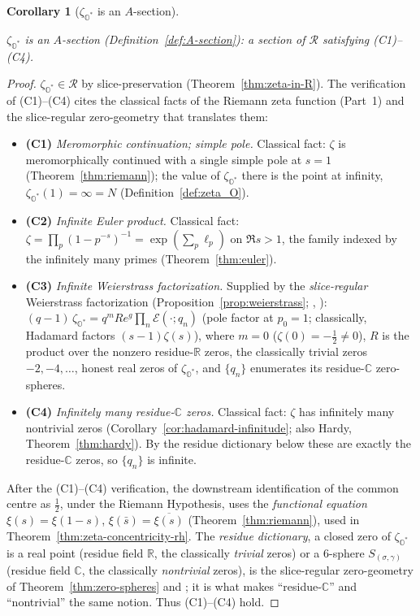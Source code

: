 \documentclass[11pt]{article}
\newcommand{\OO}{\mathbb{O}}
\newcommand{\CC}{\mathbb{C}}
\newcommand{\RR}{\mathbb{R}}
\newcommand{\Ostar}{\OO^{*}}
\newcommand{\zetaO}{\zeta_{\Ostar}}
\providecommand{\lean}[1]{}
\providecommand{\uses}[1]{}
\theoremstyle{plain}
\newtheorem{corollary}[theorem]{Corollary}
\theoremstyle{definition}
\theoremstyle{remark}
\begin{document}
\begin{corollary}[$\zetaO$ is an $A$-section]\label{cor:zeta-section}
\lean{zetaSection}
\uses{def:A-section, thm:zeta-in-R, thm:riemann, thm:euler, cor:hadamard-infinitude, prop:weierstrass, thm:zero-spheres}
$\zetaO$ is an $A$-section \textup{(Definition~\ref{def:A-section})}: a section of
$\mathcal R$ satisfying \textup{(C1)--(C4)}.
\end{corollary}
\begin{proof}
$\zetaO\in\mathcal R$ by slice-preservation (Theorem~\ref{thm:zeta-in-R}). The verification of
\textup{(C1)--(C4)} cites the classical facts of the Riemann zeta function (Part~1) and the
slice-regular zero-geometry that translates them:
\begin{itemize}[leftmargin=2em]
\item \textbf{(C1)} \emph{Meromorphic continuation; simple pole.} Classical fact: $\zeta$ is
  meromorphically continued with a single simple pole at $s=1$ (Theorem~\ref{thm:riemann});
  the value of $\zetaO$ there is the point at infinity, $\zetaO(1)=\infty=N$
  (Definition~\ref{def:zeta_O}).
\item \textbf{(C2)} \emph{Infinite Euler product.} Classical fact: $\zeta=\prod_p(1-p^{-s})^{-1}
  =\exp(\sum_p\ell_p)$ on $\Re s>1$, the family indexed by the infinitely many primes
  (Theorem~\ref{thm:euler}).
\item \textbf{(C3)} \emph{Infinite Weierstrass factorization.} Supplied by the
  \emph{slice-regular} Weierstrass factorization (Proposition~\ref{prop:weierstrass};
  \cite[Prop.~3.1, Thm.~3.2]{AdFslice}, \cite{GV}):
  $(q-1)\,\zetaO=q^{m}Re^{g}\prod_n\mathcal E(\cdot;q_n)$ \textup{(}pole factor at $p_0=1$;
  classically, Hadamard factors $(s-1)\zeta(s)$\textup{)}, where $m=0$
  \textup{(}$\zeta(0)=-\tfrac12\neq0$\textup{)}, $R$ is the product over the nonzero
  residue-$\RR$ zeros, the classically trivial zeros $-2,-4,\dots$, honest real zeros of
  $\zetaO$, and $\{q_n\}$ enumerates its residue-$\CC$ zero-spheres.
\item \textbf{(C4)} \emph{Infinitely many residue-$\CC$ zeros.} Classical fact: $\zeta$ has
  infinitely many nontrivial zeros (Corollary~\ref{cor:hadamard-infinitude}; also Hardy,
  Theorem~\ref{thm:hardy}). By the residue dictionary below these are exactly the residue-$\CC$
  zeros, so $\{q_n\}$ is infinite.
\end{itemize}
After the \textup{(C1)--(C4)} verification, the downstream identification of the common centre
as $\tfrac12$, under the Riemann Hypothesis, uses the
\emph{functional equation} $\xi(s)=\xi(1-s)$,
$\xi(\bar s)=\overline{\xi(s)}$ (Theorem~\ref{thm:riemann}), used in Theorem~\ref{thm:zeta-concentricity-rh}. The
\emph{residue dictionary}, a closed zero of $\zetaO$ is a real point (residue field $\RR$, the
classically \emph{trivial} zeros) or a $6$-sphere $S_{(\sigma,\gamma)}$ (residue field $\CC$, the
classically \emph{nontrivial} zeros), is the slice-regular zero-geometry of
Theorem~\ref{thm:zero-spheres} and \cite{AdF}; it is what makes ``residue-$\CC$'' and
``nontrivial'' the same notion. Thus \textup{(C1)--(C4)} hold.
\end{proof}
\end{document}
